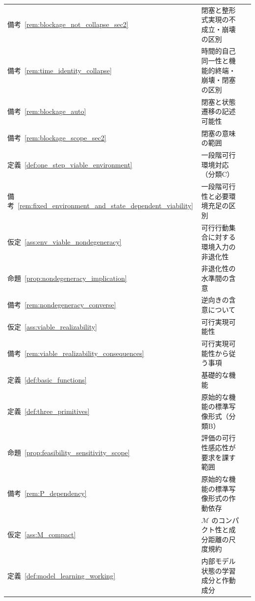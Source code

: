 \begin{longtable}{p{2.4cm} p{10.4cm} r}
備考~\ref{rem:blockage_not_collapse_sec2} & 閉塞と整形式実現の不成立・崩壊の区別 & \pageref{rem:blockage_not_collapse_sec2} \\
備考~\ref{rem:time_identity_collapse} & 時間的自己同一性と機能的終端・崩壊・閉塞の区別 & \pageref{rem:time_identity_collapse} \\
備考~\ref{rem:blockage_auto} & 閉塞と状態遷移の記述可能性 & \pageref{rem:blockage_auto} \\
備考~\ref{rem:blockage_scope_sec2} & 閉塞の意味の範囲 & \pageref{rem:blockage_scope_sec2} \\
定義~\ref{def:one_step_viable_environment} & 一段階可行環境対応（分類C） & \pageref{def:one_step_viable_environment} \\
備考~\ref{rem:fixed_environment_and_state_dependent_viability} & 一段階可行性と必要環境充足の区別 & \pageref{rem:fixed_environment_and_state_dependent_viability} \\
仮定~\ref{ass:env_viable_nondegeneracy} & 可行行動集合に対する環境入力の非退化性 & \pageref{ass:env_viable_nondegeneracy} \\
命題~\ref{prop:nondegeneracy_implication} & 非退化性の水準間の含意 & \pageref{prop:nondegeneracy_implication} \\
備考~\ref{rem:nondegeneracy_converse} & 逆向きの含意について & \pageref{rem:nondegeneracy_converse} \\
仮定~\ref{ass:viable_realizability} & 可行実現可能性 & \pageref{ass:viable_realizability} \\
備考~\ref{rem:viable_realizability_consequences} & 可行実現可能性から従う事項 & \pageref{rem:viable_realizability_consequences} \\
定義~\ref{def:basic_functions} & 基礎的な機能 & \pageref{def:basic_functions} \\
定義~\ref{def:three_primitives} & 原始的な機能の標準写像形式（分類B） & \pageref{def:three_primitives} \\
命題~\ref{prop:feasibility_sensitivity_scope} & 評価の可行性感応性が要求を課す範囲 & \pageref{prop:feasibility_sensitivity_scope} \\
備考~\ref{rem:P_dependency} & 原始的な機能の標準写像形式の作動依存 & \pageref{rem:P_dependency} \\
仮定~\ref{ass:M_compact} & $\mathcal{M}$ のコンパクト性と成分距離の尺度規約 & \pageref{ass:M_compact} \\
定義~\ref{def:model_learning_working} & 内部モデル状態の学習成分と作動成分 & \pageref{def:model_learning_working} \\

\end{longtable}
